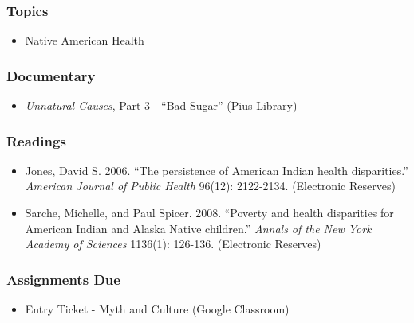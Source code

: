 \documentclass[]{book}
\providecommand{\tightlist}{%
  \setlength{\itemsep}{0pt}\setlength{\parskip}{0pt}}
\theoremstyle{definition}
\theoremstyle{definition}
\theoremstyle{definition}
\theoremstyle{remark}
\begin{document}
\hypertarget{topics-26}{%
\subsubsection*{Topics}\label{topics-26}}

\begin{itemize}
\tightlist
\item
  Native American Health
\end{itemize}

\hypertarget{documentary-3}{%
\subsubsection*{Documentary}\label{documentary-3}}

\begin{itemize}
\tightlist
\item
  \emph{Unnatural Causes}, Part 3 - ``Bad Sugar'' (Pius Library)
\end{itemize}

\hypertarget{readings-24}{%
\subsubsection*{Readings}\label{readings-24}}

\begin{itemize}
\tightlist
\item
  Jones, David S. 2006. ``The persistence of American Indian health
  disparities.'' \emph{American Journal of Public Health} 96(12):
  2122-2134. (Electronic Reserves)
\item
  Sarche, Michelle, and Paul Spicer. 2008. ``Poverty and health
  disparities for American Indian and Alaska Native children.''
  \emph{Annals of the New York Academy of Sciences} 1136(1): 126-136.
  (Electronic Reserves)
\end{itemize}

\hypertarget{assignments-due-6}{%
\subsubsection*{Assignments Due}\label{assignments-due-6}}

\begin{itemize}
\tightlist
\item
  Entry Ticket - Myth and Culture (Google Classroom)
\end{itemize}
\end{document}
